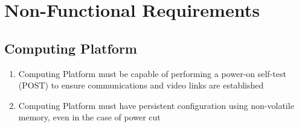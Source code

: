\documentclass[10pt,letterpaper]{article}
\begin{document}
\section{Non-Functional Requirements}\label{section:nonfuncrec}

\subsection{Computing Platform}
\begin{enumerate}[label=NF.CP.\arabic*, wide=1cm, widest=3cm, leftmargin=*, font=\bfseries, noitemsep,topsep=0pt, parsep=4pt, partopsep=0pt]
	\item Computing Platform must be capable of performing a power-on self-test (POST) to ensure communications and video links are established
	\item Computing Platform must have persistent configuration using non-volatile memory, even in the case of power cut
\end{enumerate}

\end{document}
